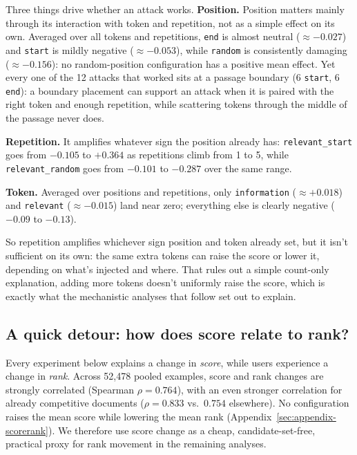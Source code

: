 \documentclass[11pt]{article}
\begin{document}
Three things drive whether an attack works. \textbf{Position.} Position
matters mainly through its interaction with token and repetition, not as
a simple effect on its own. Averaged over all tokens and repetitions,
\texttt{end} is almost neutral ($\approx-0.027$) and \texttt{start} is
mildly negative ($\approx-0.053$), while \texttt{random} is consistently
damaging ($\approx-0.156$): no random-position configuration has a
positive mean effect. Yet every one of the
12 attacks that worked sits at a passage boundary (6 \texttt{start}, 6
\texttt{end}): a boundary placement can support an attack when it is
paired with the right token and enough repetition, while scattering
tokens through the middle of the passage never does.

\textbf{Repetition.} It amplifies whatever sign the position already has:
\texttt{relevant\_start} goes from $-0.105$ to $+0.364$ as repetitions climb
from 1 to 5, while \texttt{relevant\_random} goes from $-0.101$ to $-0.287$
over the same range.

\textbf{Token.} Averaged over positions and repetitions, only
\texttt{information} ($\approx+0.018$) and \texttt{relevant}
($\approx-0.015$) land near zero; everything else is clearly negative
($-0.09$ to $-0.13$).

So repetition amplifies whichever sign position and token already set, but
it isn't sufficient on its own: the same extra tokens can raise the score
or lower it, depending on what's injected and where. That rules out a
simple count-only explanation, adding more tokens doesn't uniformly raise
the score, which is exactly what the mechanistic analyses that follow set
out to explain.

\subsection{A quick detour: how does score relate to rank?}
\label{sec:results-scorerank}

Every experiment below explains a change in \emph{score}, while users
experience a change in \emph{rank}. Across 52{,}478 pooled examples,
score and rank changes are strongly correlated
(Spearman $\rho=0.764$), with an even stronger correlation for already
competitive documents ($\rho=0.833$ vs.\ $0.754$ elsewhere). No
configuration raises the mean score while lowering the mean rank
(Appendix~\ref{sec:appendix-scorerank}). We therefore use score change
as a cheap, candidate-set-free, practical proxy for rank movement in
the remaining analyses.
\end{document}

